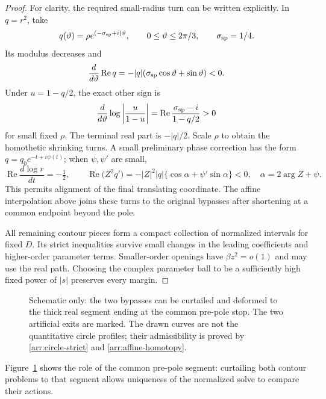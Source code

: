 \begin{proof}
For clarity, the required small-radius turn can be written explicitly.
In \(q=r^2\), take
\[
 q(\vartheta)=\rho e^{(-\sigma_{\rm sp}+i)\vartheta},
 \qquad 0\le\vartheta\le2\pi/3,\qquad \sigma_{\rm sp}=1/4.
\]
Its modulus decreases and
\[
 \frac{d}{d\vartheta}\operatorname{Re}q
   =-|q|(\sigma_{\rm sp}\cos\vartheta+\sin\vartheta)<0.
\]
Under \(u=1-q/2\), the exact other sign is
\[
 \frac{d}{d\vartheta}\log\left|\frac u{1-u}\right|
    =\operatorname{Re}\frac{\sigma_{\rm sp}-i}{1-q/2}>0
\]
for small fixed \(\rho\).  The terminal real part is
\(-|q|/2\).  Scale \(\rho\) to obtain the homothetic shrinking turns.
A small preliminary phase correction has the form
\(q=q_0e^{-t+i\psi(t)}\); when \(\psi,\psi'\) are small,
\[
 \operatorname{Re}\frac{d\log r}{dt}=-\tfrac12,\qquad
 \operatorname{Re}\bigl(Z^2q'\bigr)
   =-|Z|^2|q|\{\cos\alpha+\psi'\sin\alpha\}<0,
 \quad\alpha=2\arg Z+\psi.
\]
This permits alignment of the final translating coordinate.
The affine interpolation above joins these turns to the original
bypasses after shortening at a common endpoint beyond the pole.

All remaining contour pieces form a compact collection of normalized
intervals for fixed \(D\).  Its strict inequalities survive small
changes in the leading coefficients and higher-order parameter
terms.  Smaller-order openings have \(\beta z^2=o(1)\) and may use
the real path.  Choosing the complex parameter ball to be a
sufficiently high fixed power of \(|s|\) preserves every margin.
\end{proof}

\begin{figure}[ht]
 \centering
 \caption{Schematic only: the two bypasses can be curtailed and
 deformed to the thick real segment ending at the common pre-pole stop.
 The two artificial exits are marked.  The drawn curves are not
 the quantitative circle profiles; their admissibility is proved
 by \eqref{arr:circle-strict} and \eqref{arr:affine-homotopy}.}
 \label{arr:contour-schematic}
\end{figure}

Figure~\ref{arr:contour-schematic} shows the role of the common
pre-pole segment: curtailing both contour problems to that segment
allows uniqueness of the normalized solve to compare their actions.
